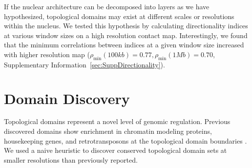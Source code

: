 If the nuclear architecture can be decomposed into layers as we have hypothesized, topological domains may exist at different
scales or resolutions within the nucleus.  We tested this hypothesis by calculating directionality indices at various window sizes
on a high resolution contact map.  Interestingly, we found that the minimum correlations between indices at a given window size increased
with higher resolution map ($\rho_{\min}(100kb) = 0.77, \rho_{\min}(1Mb) = 0.70$, Supplementary Information~\ref{sec:SuppDirectionality}).

\section*{Domain Discovery}

Topological domains represent a novel level of genomic regulation.  Previous discovered domains show enrichment in chromatin modeling proteins,
housekeeping genes, and retrotransposons at the topological domain boundaries \citep{dixon2012}.  We used a naive heuristic to discover conserved
topological domain sets at smaller resolutions than previously reported.


